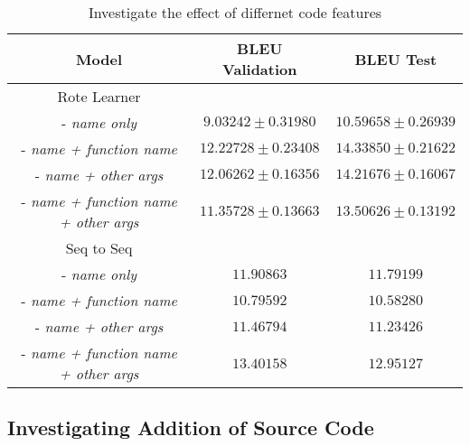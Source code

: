 \begin{table}[h!]
\begin{center}
\begin{tabular}{ c | c | c }
    Model                               & BLEU Validation            & BLEU Test  \\
    \hline
    \hline
    Rote Learner                        &                  & \\    
    - \textit{name only}                & $ 9.03242  \pm  0.31980 $ & $ 10.59658 \pm 0.26939 $  \\
    - \textit{name + function name}     & $ 12.22728 \pm  0.23408 $ & $ 14.33850 \pm 0.21622 $  \\
    - \textit{name + other args}        & $ 12.06262 \pm  0.16356 $ & $ 14.21676 \pm 0.16067 $  \\
    - \textit{name + function name + other args}  & $ 11.35728 \pm  0.13663 $ & $ 13.50626 \pm 0.13192 $ \\
    \hline
    \hline
    Seq to Seq                          &                  & \\
    - \textit{name only}                & $ 11.90863 $ & $ 11.79199 $ \\
    - \textit{name + function name}     & $ 10.79592 $ & $ 10.58280 $  \\
    - \textit{name + other args}        & $ 11.46794 $ & $ 11.23426 $ \\
    - \textit{name + function name + other args}   & $ 13.40158 $ & $ 12.95127 $ \\
    \hline
\end{tabular}
\caption {Investigate the effect of differnet code features}
\label{table:tokenization}
\end{center}
\end{table}





\subsection{Investigating Addition of Source Code} %
\label{subs:investigating_tokenizations_with_source_code}

